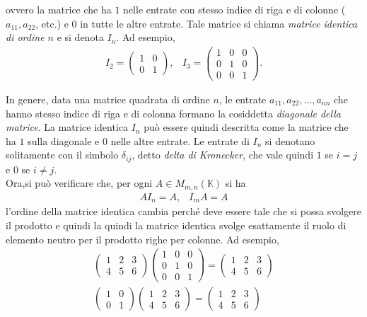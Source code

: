 ovvero la matrice che ha $1$ nelle entrate con stesso indice di riga e di colonne ($a_{11},a_{22}$, etc.) e 0
in tutte le altre entrate. Tale matrice si chiama \textit{matrice identica di ordine $n$} e si denota $I_n$.
Ad esempio,
\begin{eqnarray*}
  I_2=
  \begin{pmatrix}
    1 & 0\\
    0 & 1
  \end{pmatrix}, & I_3=
                   \begin{pmatrix}
                     1 & 0 & 0\\
                     0 & 1 & 0\\
                     0 & 0 & 1
                   \end{pmatrix}.
\end{eqnarray*}
\begin{oss}
  \label{oss:Compinveeproddimatrici3}
  In genere, data una matrice quadrata di ordine $n$, le entrate $a_{11},a_{22},\dots,a_{nn}$ che hanno stesso
  indice di riga e di colonna formano la cosiddetta \textit{diagonale della matrice}. La matrice identica
  $I_n$ può essere quindi descritta come la matrice che ha $1$ sulla diagonale e $0$ nelle altre entrate.
  Le entrate di $I_n$ si denotano solitamente con il simbolo $\delta_{ij}$, detto \textit{delta di
    Kronecker}, che vale quindi $1$ se $i=j$ e 0 se $i\neq j$.\\
  Ora,si può verificare che, per ogni $A\in M_{m,n}(\mathds{K})$ si ha
  \begin{eqnarray*}
    AI_n=A, & I_mA=A
  \end{eqnarray*}
  l'ordine della matrice identica cambia perché deve essere tale che si possa svolgere il prodotto e quindi
  la quindi la matrice identica svolge esattamente il ruolo di elemento neutro per il prodotto righe per
  colonne. Ad esempio,
  \begin{eqnarray*}
    \begin{pmatrix}
      1 & 2 & 3\\
      4 & 5 & 6 
    \end{pmatrix}
    \begin{pmatrix}
      1 & 0 & 0\\
      0 & 1 & 0\\
      0 & 0 & 1
    \end{pmatrix}=
    \begin{pmatrix}
      1 & 2 & 3\\
      4 & 5 & 6
    \end{pmatrix}\\
    \begin{pmatrix}
      1 & 0 \\
      0 & 1
    \end{pmatrix}
    \begin{pmatrix}
      1 & 2 & 3\\
      4 & 5 & 6 
    \end{pmatrix}=
    \begin{pmatrix}
      1 & 2 & 3\\
      4 & 5 & 6
    \end{pmatrix}
  \end{eqnarray*}
\end{oss}
